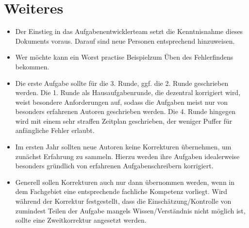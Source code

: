 \documentclass[../main.tex]{subfiles}
\begin{document}
\newpage
\section{Weiteres}
\begin{itemize}
    \item Der Einstieg in das Aufgabenentwicklerteam setzt die Kenntnisnahme dieses Dokuments voraus. Darauf sind neue Personen entsprechend hinzuweisen.
    \item Wer möchte kann ein \glqq Worst practise Beispiel\grqq zum Üben des Fehlerfindens bekommen.
    \item Die erste Aufgabe sollte für die 3. Runde, ggf. die 2. Runde geschrieben werden. Die 1. Runde als Hausaufgabenrunde, die dezentral korrigiert wird, weist besondere Anforderungen auf, sodass die Aufgaben meist nur von besonders erfahrenen Autoren geschrieben werden. Die 4. Runde hingegen wird mit einem sehr straffen Zeitplan geschrieben, der weniger Puffer für anfängliche Fehler erlaubt. 
    \item Im ersten Jahr sollten neue Autoren keine Korrekturen übernehmen, um zunächst Erfahrung zu sammeln. Hierzu werden ihre Aufgaben idealerweise besonders gründlich von erfahrenen Aufgabenschreibern korrigiert. 
    \item Generell sollen Korrekturen auch nur dann übernommen werden, wenn in dem Fachgebiet eine entsprechende fachliche Kompetenz vorliegt. Wird während der Korrektur festgestellt, dass die Einschätzung/Kontrolle von zumindest Teilen der Aufgabe mangels Wissen/Verständnis nicht möglich ist, sollte eine Zweitkorrektur angesetzt werden.
\end{itemize}
\end{document}
